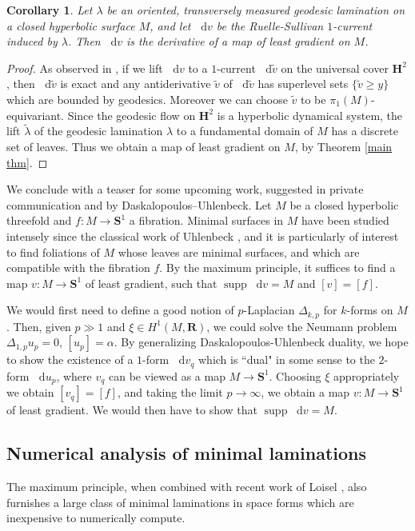 \documentclass[reqno,10pt]{amsart}
\newcommand{\RR}{\mathbf{R}}
\newcommand{\Hyp}{\mathbf H}
\newcommand{\Sph}{\mathbf S}
\DeclareMathOperator{\supp}{supp}
\newcommand*\dif{\mathop{}\!\mathrm{d}}
\newtheorem{corollary}[theorem]{Corollary}
\theoremstyle{definition}
\numberwithin{equation}{section}
\begin{document}
\begin{corollary}\label{ruelle sullivan antiderivative}
Let $\lambda$ be an oriented, transversely measured geodesic lamination on a closed hyperbolic surface $M$, and let $\dif v$ be the Ruelle-Sullivan $1$-current induced by $\lambda$.
Then $\dif v$ is the derivative of a map of least gradient on $M$.
\end{corollary}
\begin{proof}
As observed in \cite[\S9]{daskalopoulos2020transverse}, if we lift $\dif v$ to a $1$-current $\dif \tilde v$ on the universal cover $\Hyp^2$, then $\dif \tilde v$ is exact and any antiderivative $\tilde v$ of $\dif \tilde v$ has superlevel sets $\{\tilde v \geq y\}$ which are bounded by geodesics.
Moreover we can choose $\tilde v$ to be $\pi_1(M)$-equivariant.
Since the geodesic flow on $\Hyp^2$ is a hyperbolic dynamical system, the lift $\tilde \lambda$ of the geodesic lamination $\lambda$ to a fundamental domain of $M$ has a discrete set of leaves.
Thus we obtain a map of least gradient on $M$, by Theorem \ref{main thm}.
\end{proof}

We conclude with a teaser for some upcoming work, suggested in private communication and \cite[Problems 9.12--9.13]{daskalopoulos2020transverse} by Daskalopoulos--Uhlenbeck.
Let $M$ be a closed hyperbolic threefold and $f: M \to \Sph^1$ a fibration.
Minimal surfaces in $M$ have been studied intensely since the classical work of Uhlenbeck \cite{Uhlenbeck1983ClosedMS}, and it is particularly of interest to find foliations of $M$ whose leaves are minimal surfaces, and which are compatible with the fibration $f$.
By the maximum principle, it suffices to find a map $v: M \to \Sph^1$ of least gradient, such that $\supp \dif v = M$ and $[v] = [f]$.

We would first need to define a good notion of $p$-Laplacian $\Delta_{k,p}$ for $k$-forms on $M$.
Then, given $p \gg 1$ and $\xi \in H^1(M, \RR)$, we could solve the Neumann problem $\Delta_{1, p} u_p = 0$, $[u_p] = \alpha$.
By generalizing Daskalopoulos-Uhlenbeck duality, we hope to show the existence of a $1$-form $\dif v_q$ which is ``dual" in some sense to the $2$-form $\dif u_p$, where $v_q$ can be viewed as a map $M \to \Sph^1$.
Choosing $\xi$ appropriately we obtain $[v_q] = [f]$, and taking the limit $p \to \infty$, we obtain a map $v: M \to \Sph^1$ of least gradient.
We would then have to show that $\supp \dif v = M$.

\subsection{Numerical analysis of minimal laminations}\label{numerics}
The maximum principle, when combined with recent work of Loisel \cite{Loisel20}, also furnishes a large class of minimal laminations in space forms which are inexpensive to numerically compute.
\end{document}
